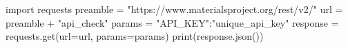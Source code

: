 import requests
preamble = "https://www.materialsproject.org/rest/v2/"
url = preamble + "api_check"
params = {"API_KEY":"unique_api_key"}
response = requests.get(url=url, params=params)
print(response.json())
